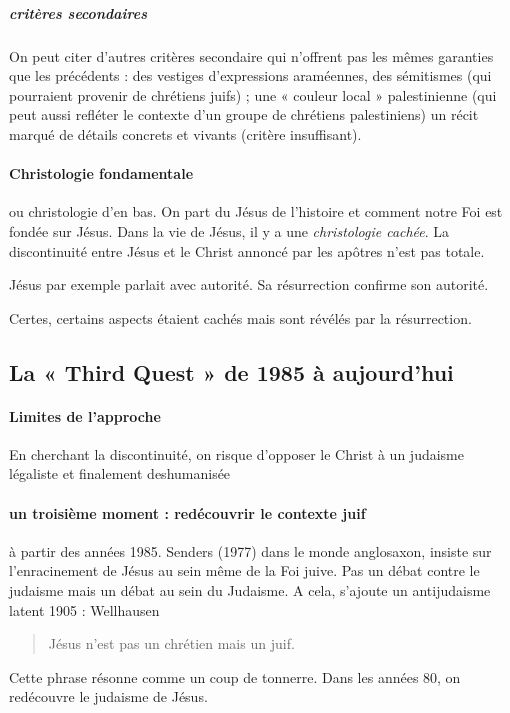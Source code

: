 \subparagraph{critères secondaires}

On peut citer d'autres critères secondaire qui n'offrent pas les mêmes
garanties que les précédents : des vestiges d'expressions araméennes,
des sémitismes (qui pourraient provenir de chrétiens juifs) ; une «
couleur local » palestinienne (qui peut aussi refléter le contexte d'un
groupe de chrétiens palestiniens) un récit marqué de détails concrets et
vivants (critère insuffisant).




\paragraph{Christologie fondamentale} ou christologie d'en bas. On part du Jésus de l'histoire et comment notre Foi est fondée sur Jésus. Dans la vie de Jésus, il y a une \textit{christologie cachée}. La discontinuité entre Jésus et le Christ annoncé par les apôtres n'est pas totale. 
\begin{Ex}
Jésus par exemple parlait avec autorité. Sa résurrection confirme son autorité. 
\end{Ex}

Certes, certains aspects étaient cachés mais sont révélés par la résurrection.


\subsection{La « Third Quest » de 1985 à aujourd’hui}
\paragraph{Limites de l'approche} En cherchant la discontinuité, on risque d'opposer le Christ à un judaisme légaliste et finalement deshumanisée 

\paragraph{un troisième moment : redécouvrir le contexte juif} à partir des années 1985. Senders (1977) dans le monde anglosaxon, insiste sur l'enracinement de Jésus au sein même de la Foi juive. Pas un débat contre le judaisme mais un débat au sein du Judaisme.  A cela, s'ajoute un antijudaisme latent 
1905 : Wellhausen 
\begin{quote}
    Jésus n'est pas un chrétien mais un juif.
\end{quote}
Cette phrase résonne comme un coup de tonnerre. 
Dans les années 80, on redécouvre le judaisme de Jésus. 


